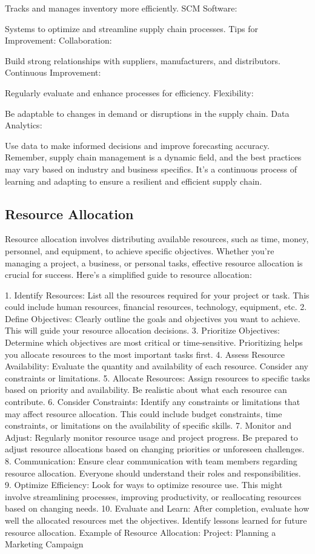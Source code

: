 Tracks and manages inventory more efficiently.
SCM Software:

Systems to optimize and streamline supply chain processes.
Tips for Improvement:
Collaboration:

Build strong relationships with suppliers, manufacturers, and distributors.
Continuous Improvement:

Regularly evaluate and enhance processes for efficiency.
Flexibility:

Be adaptable to changes in demand or disruptions in the supply chain.
Data Analytics:

Use data to make informed decisions and improve forecasting accuracy.
Remember, supply chain management is a dynamic field, and the best practices may vary based on industry and business specifics. It's a continuous process of learning and adapting to ensure a resilient and efficient supply chain.
% 
\subsection{Resource Allocation}
\label{relatedknowledge:Supply Chain Management:Resource Allocation}
% 
Resource allocation involves distributing available resources, such as time, money, personnel, and equipment, to achieve specific objectives. Whether you're managing a project, a business, or personal tasks, effective resource allocation is crucial for success. Here's a simplified guide to resource allocation:

1. Identify Resources:
List all the resources required for your project or task. This could include human resources, financial resources, technology, equipment, etc.
2. Define Objectives:
Clearly outline the goals and objectives you want to achieve. This will guide your resource allocation decisions.
3. Prioritize Objectives:
Determine which objectives are most critical or time-sensitive. Prioritizing helps you allocate resources to the most important tasks first.
4. Assess Resource Availability:
Evaluate the quantity and availability of each resource. Consider any constraints or limitations.
5. Allocate Resources:
Assign resources to specific tasks based on priority and availability. Be realistic about what each resource can contribute.
6. Consider Constraints:
Identify any constraints or limitations that may affect resource allocation. This could include budget constraints, time constraints, or limitations on the availability of specific skills.
7. Monitor and Adjust:
Regularly monitor resource usage and project progress. Be prepared to adjust resource allocations based on changing priorities or unforeseen challenges.
8. Communication:
Ensure clear communication with team members regarding resource allocation. Everyone should understand their roles and responsibilities.
9. Optimize Efficiency:
Look for ways to optimize resource use. This might involve streamlining processes, improving productivity, or reallocating resources based on changing needs.
10. Evaluate and Learn:
After completion, evaluate how well the allocated resources met the objectives. Identify lessons learned for future resource allocation.
Example of Resource Allocation:
Project: Planning a Marketing Campaign

